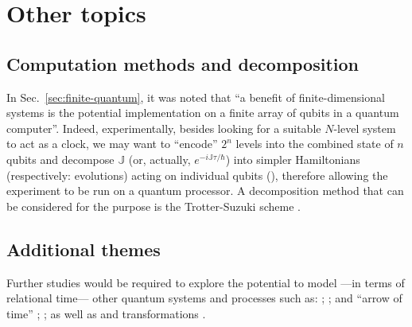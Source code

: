 \section{Other topics}\label{sec:outlook-misc}

\subsection{Computation methods and decomposition}

In Sec.~\ref{sec:finite-quantum}, it was noted that
``a benefit of finite-dimensional systems is the potential implementation on a finite array of
qubits in a quantum computer''.
Indeed,
experimentally,
besides looking for a suitable $N$-level system to act as a clock,
we may want to ``encode'' $2^{n}$ levels into the combined state of $n$
qubits and
decompose $\mathbb{J}$ (or, actually, $e^{-i\mathbb{J}\tau/\hbar}$)
into simpler Hamiltonians (respectively: evolutions)
acting on individual qubits (),
therefore allowing the experiment to be run on a quantum processor.
A decomposition method that can be considered for the purpose
is the Trotter-Suzuki scheme
\parencite{Trotter-Suzuki:exp, Trotter-Suzuki:GPU}.

\subsection{Additional themes}

Further studies 
would be required to explore the potential to model
---in terms of relational time---
other quantum systems and processes such as:
%
 \parencite{crystal2,crystal3,crystal2012};
%
 \parencite{TQM2};
%
 and ``arrow of time'' \parencite{Josset_Thermo};
%
 \parencite{Souza_Spontaneous};
%
as well as
 and transformations \parencite{Adlam_ReferenceFrames}.
